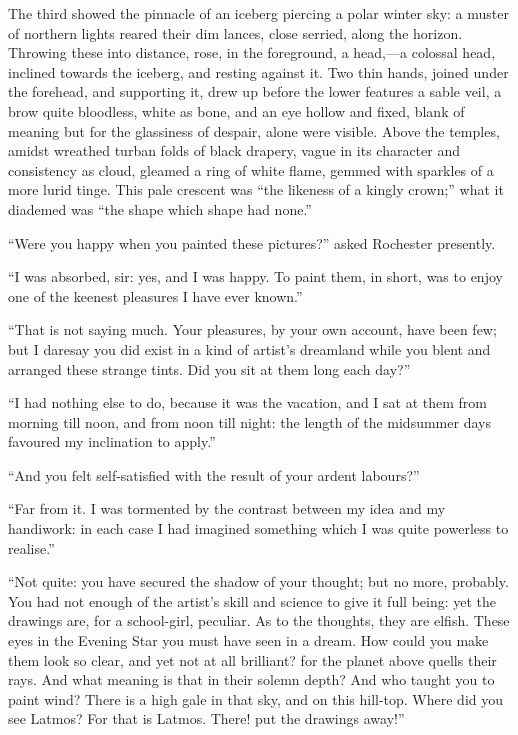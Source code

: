 The third showed the pinnacle of an iceberg piercing a polar winter sky:
a muster of northern lights reared their dim lances, close serried,
along the horizon. Throwing these into distance, rose, in the
foreground, a head,---a colossal head, inclined towards the iceberg, and
resting against it. Two thin hands, joined under the forehead, and
supporting it, drew up before the lower features a sable veil, a brow
quite bloodless, white as bone, and an eye hollow and fixed, blank of
meaning but for the glassiness of despair, alone were visible. Above
the temples, amidst wreathed turban folds of black drapery, vague in its
character and consistency as cloud, gleamed a ring of white flame,
gemmed with sparkles of a more lurid tinge. This pale crescent was
\enquote{the likeness of a kingly crown;} what it diademed was
\enquote{the shape which shape had none.}

\enquote{Were you happy when you painted these pictures?} asked \Mr{}
 Rochester presently.

\enquote{I was absorbed, sir: yes, and I was happy. To paint them, in
short, was to enjoy one of the keenest pleasures I have ever known.}

\enquote{That is not saying much. Your pleasures, by your own account,
have been few; but I daresay you did exist in a kind of artist's
dreamland while you blent and arranged these strange tints. Did you sit
at them long each day?}

\enquote{I had nothing else to do, because it was the vacation, and I
sat at them from morning till noon, and from noon till night: the length
of the midsummer days favoured my inclination to apply.}

\enquote{And you felt self-satisfied with the result of your ardent
labours?}

\enquote{Far from it. I was tormented by the contrast between my idea
and my handiwork: in each case I had imagined something which I was
quite powerless to realise.}

\enquote{Not quite: you have secured the shadow of your thought; but no
more, probably. You had not enough of the artist's skill and science to
give it full being: yet the drawings are, for a school-girl, peculiar. 
As to the thoughts, they are elfish. These eyes in the Evening Star you
must have seen in a dream. How could you make them look so clear, and
yet not at all brilliant? for the planet above quells their rays. And
what meaning is that in their solemn depth? And who taught you to paint
wind? There is a high gale in that sky, and on this hill-top. Where
did you see Latmos? For that is Latmos. There! put the drawings away!}

